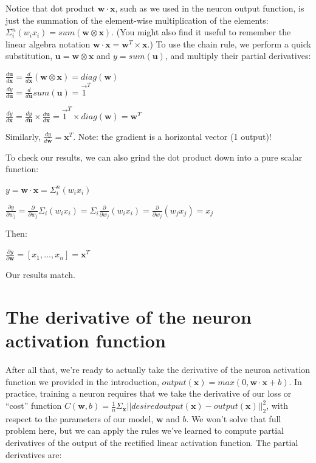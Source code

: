 \documentclass[11pt]{article}
\begin{document}
Notice that dot product $\mathbf{w} \cdot \mathbf{x}$, such as we used in the neuron output function, is just the summation of the element-wise multiplication of the elements: $\Sigma_i^n (w_i x_i) = sum(\mathbf{w} \otimes \mathbf{x})$. (You might also find it useful to remember the linear algebra notation $\mathbf{w} \cdot \mathbf{x} = \mathbf{w}^{T} \times \mathbf{x}$.)  To use the chain rule, we perform a quick substitution, $\mathbf{u} = \mathbf{w} \otimes \mathbf{x}$ and $y = sum(\mathbf{u})$, and multiply their partial derivatives:

$\frac{d \mathbf{u}}{d\mathbf{x}} = \frac{d}{d\mathbf{x}} (\mathbf{w} \otimes \mathbf{x}) = diag(\mathbf{w})$\\
$\frac{dy}{d\mathbf{u}} = \frac{d}{d\mathbf{u}} sum(\mathbf{u}) = \vec{1}^T$

$\frac{dy}{d\mathbf{x}} = \frac{dy}{d\mathbf{u}} \times \frac{d\mathbf{u}}{d\mathbf{x}} = \vec{1}^T \times diag(\mathbf{w}) = \mathbf{w}^T$

Similarly, $\frac{dy}{d\mathbf{w}} = \mathbf{x}^T$. Note: the gradient is a horizontal vector (1 output)!

To check our results, we can also grind the dot product down into a pure scalar function:

$y = \mathbf{w} \cdot \mathbf{x} = \Sigma_i^n (w_i x_i)$

$\frac{\partial y}{\partial w_j} = \frac{\partial}{\partial w_j} \Sigma_i (w_i x_i) = \Sigma_i \frac{\partial}{\partial w_j} (w_i x_i) = \frac{\partial}{\partial w_j} (w_j x_j) = x_j$

Then:

$\frac{\partial y}{\partial \mathbf{w}} = [ x_1, \ldots, x_n ] = \mathbf{x}^T$

Our results match. 

\section{The derivative of the neuron activation function}

After all that, we're ready to actually take the derivative of the neuron activation function we provided in the introduction, $output(\mathbf{x}) = max(0, \mathbf{w} \cdot \mathbf{x} + b)$.  In practice, training a neuron requires that we take the derivative of our loss  or ``cost'' function $C(\mathbf{w},b) = \frac{1}{n} \Sigma_{\mathbf{x}} ||desiredoutput(\mathbf{x}) - output(\mathbf{x})||_2^2$, with respect to the parameters of our model, $\mathbf{w}$ and $b$.  We won't solve that full problem here, but we can apply the rules we've learned to compute partial derivatives of the output of the rectified linear activation function. The partial derivatives are:
\end{document}
